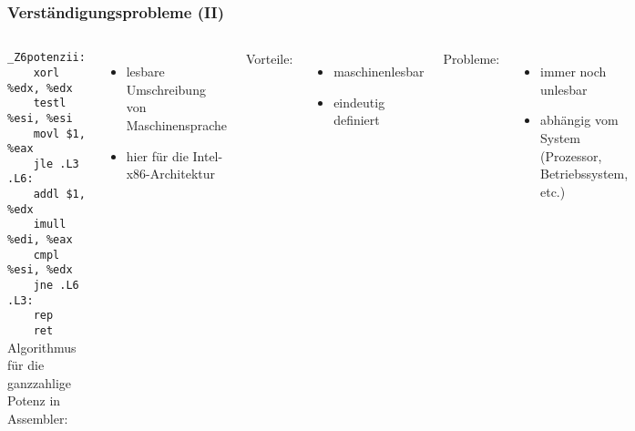     \begin{frame}
        \frametitle{Verständigungsprobleme (II)}
        \begin{columns}
            \small
            \texttt{\_Z6potenzii:}\\
            \texttt{~~~~xorl \%edx, \%edx}\\
            \texttt{~~~~testl \%esi, \%esi}\\
            \texttt{~~~~movl \$1, \%eax}\\
            \texttt{~~~~jle .L3}\\
            \texttt{.L6:}\\
            \texttt{~~~~addl \$1, \%edx}\\
            \texttt{~~~~imull \%edi, \%eax}\\
            \texttt{~~~~cmpl \%esi, \%edx}\\
            \texttt{~~~~jne	.L6}\\
            \texttt{.L3:}\\
            \texttt{~~~~rep}\\
            \texttt{~~~~ret}
            Algorithmus für die ganzzahlige Potenz in Assembler:
            \begin{itemize}
                \item lesbare Umschreibung von Maschinensprache
                \item hier für die Intel-x86-Architektur
            \end{itemize}
            \pause Vorteile:
            \begin{itemize}
                \item maschinenlesbar
                \item eindeutig definiert
            \end{itemize}
            \pause Probleme:
            \begin{itemize}
                \item immer noch unlesbar %
                \item abhängig vom System (Prozessor, Betriebssystem, etc.)
            \end{itemize}
        \end{columns}
    \end{frame}

